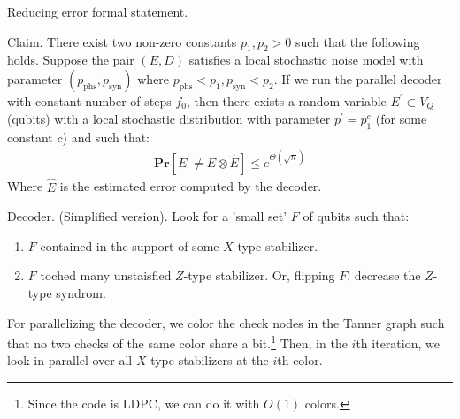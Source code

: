\documentclass{beamer}
\begin{document}
\begin{frame}{Reducing error formal statement.}

  \begin{block}{Claim.}
    There exist two non-zero constants $p_1,p_2 > 0$ such that the following holds. Suppose the pair $(E,D)$ satisfies a local stochastic noise model with parameter $(p_{\text{phs}}, p_{\text{syn}})$ where $p_{\text{phs}} <p_{1} , p_{\text{syn}} < p_{2}$. If we run the parallel decoder with constant number of steps $f_{0}$, then there exists a random variable $E^{\prime} \subset V_{Q}$ (qubits) with a local stochastic distribution with parameter $p^{\prime} = p_{1}^{c}$ (for some constant $c$) and such that:  
    \begin{equation*}
      \begin{split}
        \mathbf{Pr}\left[  E^{\prime} \neq E \otimes \hat{E}   \right] \le e^{\Theta(\sqrt{n})}
      \end{split}
    \end{equation*}
Where $\hat{E}$ is the estimated error computed by the decoder.
  \end{block}


\end{frame}



\begin{frame}
  \begin{block}{Decoder. (Simplified version).}
    Look for a 'small set' $F$ of qubits such that:
    \begin{enumerate}
      \item $F$ contained in the support of some $X$-type stabilizer. 
      \item $F$ toched many unstaisfied $Z$-type stabilizer. Or, flipping $F$, decrease the $Z$-type syndrom.    
    \end{enumerate}
  \end{block}
For parallelizing the decoder, we color the check nodes in the Tanner graph such that no two checks of the same color share a bit.\footnote{Since the code is LDPC, we can do it with $O(1)$ colors.} Then, in the $i$th iteration, we look in parallel over all $X$-type stabilizers at the $i$th color.
\end{frame}
\end{document}
